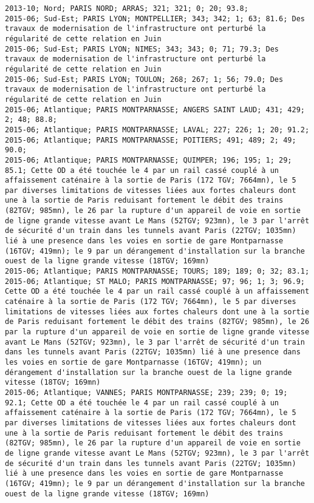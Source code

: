 \documentclass{article}
\begin{document}
\begin{Verbatim}[commandchars=\\\{\}]
2013-10; Nord; PARIS NORD; ARRAS; 321; 321; 0; 20; 93.8; 
2015-06; Sud-Est; PARIS LYON; MONTPELLIER; 343; 342; 1; 63; 81.6; Des travaux de modernisation de l'infrastructure ont perturbé la régularité de cette relation en Juin
2015-06; Sud-Est; PARIS LYON; NIMES; 343; 343; 0; 71; 79.3; Des travaux de modernisation de l'infrastructure ont perturbé la régularité de cette relation en Juin
2015-06; Sud-Est; PARIS LYON; TOULON; 268; 267; 1; 56; 79.0; Des travaux de modernisation de l'infrastructure ont perturbé la régularité de cette relation en Juin
2015-06; Atlantique; PARIS MONTPARNASSE; ANGERS SAINT LAUD; 431; 429; 2; 48; 88.8; 
2015-06; Atlantique; PARIS MONTPARNASSE; LAVAL; 227; 226; 1; 20; 91.2; 
2015-06; Atlantique; PARIS MONTPARNASSE; POITIERS; 491; 489; 2; 49; 90.0; 
2015-06; Atlantique; PARIS MONTPARNASSE; QUIMPER; 196; 195; 1; 29; 85.1; Cette OD a été touchée le 4 par un rail cassé couplé à un affaissement caténaire à la sortie de Paris (172 TGV; 7664mn), le 5 par diverses limitations de vitesses liées aux fortes chaleurs dont une à la sortie de Paris reduisant fortement le débit des trains (82TGV; 985mn), le 26 par la rupture d'un appareil de voie en sortie de ligne grande vitesse avant Le Mans (52TGV; 923mn), le 3 par l'arrêt de sécurité d'un train dans les tunnels avant Paris (22TGV; 1035mn) lié à une presence dans les voies en sortie de gare Montparnasse (16TGV; 419mn); le 9 par un dérangement d'installation sur la branche ouest de la ligne grande vitesse (18TGV; 169mn)
2015-06; Atlantique; PARIS MONTPARNASSE; TOURS; 189; 189; 0; 32; 83.1; 
2015-06; Atlantique; ST MALO; PARIS MONTPARNASSE; 97; 96; 1; 3; 96.9; Cette OD a été touchée le 4 par un rail cassé couplé à un affaissement caténaire à la sortie de Paris (172 TGV; 7664mn), le 5 par diverses limitations de vitesses liées aux fortes chaleurs dont une à la sortie de Paris reduisant fortement le débit des trains (82TGV; 985mn), le 26 par la rupture d'un appareil de voie en sortie de ligne grande vitesse avant Le Mans (52TGV; 923mn), le 3 par l'arrêt de sécurité d'un train dans les tunnels avant Paris (22TGV; 1035mn) lié à une presence dans les voies en sortie de gare Montparnasse (16TGV; 419mn); un dérangement d'installation sur la branche ouest de la ligne grande vitesse (18TGV; 169mn)
2015-06; Atlantique; VANNES; PARIS MONTPARNASSE; 239; 239; 0; 19; 92.1; Cette OD a été touchée le 4 par un rail cassé couplé à un affaissement caténaire à la sortie de Paris (172 TGV; 7664mn), le 5 par diverses limitations de vitesses liées aux fortes chaleurs dont une à la sortie de Paris reduisant fortement le débit des trains (82TGV; 985mn), le 26 par la rupture d'un appareil de voie en sortie de ligne grande vitesse avant Le Mans (52TGV; 923mn), le 3 par l'arrêt de sécurité d'un train dans les tunnels avant Paris (22TGV; 1035mn) lié à une presence dans les voies en sortie de gare Montparnasse (16TGV; 419mn); le 9 par un dérangement d'installation sur la branche ouest de la ligne grande vitesse (18TGV; 169mn)

\end{Verbatim}
\end{document}
